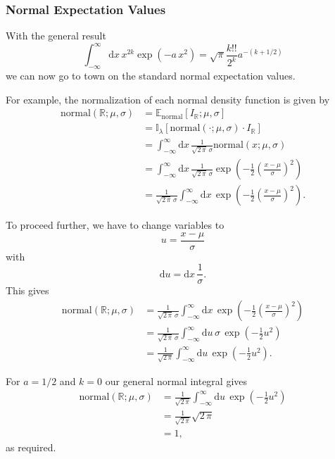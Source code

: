 \documentclass[
  letterpaper,
  DIV=11,
  numbers=noendperiod]{scrartcl}
\begin{document}
\subsubsection{Normal Expectation
Values}\label{normal-expectation-values}

With the general result \[
\int_{-\infty}^{\infty} \mathrm{d} x \,
x^{2 k} \exp \left( -a \, x^{2} \right)
=
\sqrt{\pi} \frac{k!!}{2^{k}} a^{-(k + 1/2)}
\] we can now go to town on the standard normal expectation values.

For example, the normalization of each normal density function is given
by \begin{align*}
\mathrm{normal}(\mathbb{R}; \mu, \sigma)
&=
\mathbb{E}_{\mathrm{normal}}[ I_{\mathbb{R}} ; \mu, \sigma ]
\\
&=
\mathbb{I}_{\lambda}[
  \mathrm{normal}(\cdot; \mu, \sigma) \cdot I_{\mathbb{R}}
]
\\
&=
\int_{-\infty}^{\infty} \mathrm{d} x \,
\frac{1}{\sqrt{2 \, \pi} \, \sigma}
\mathrm{normal}(x; \mu, \sigma)
\\
&=
\int_{-\infty}^{\infty} \mathrm{d} x \,
\frac{1}{\sqrt{2 \, \pi} \, \sigma}
\exp\left(
  -\frac{1}{2} \left( \frac{x - \mu}{\sigma} \right)^{2}
\right)
\\
&=
\frac{1}{\sqrt{2 \, \pi} \, \sigma}
\int_{-\infty}^{\infty} \mathrm{d} x \,
\exp \left(
  -\frac{1}{2} \left( \frac{x - \mu}{\sigma} \right)^{2}
\right).
\end{align*}

To proceed further, we have to change variables to \[
u = \frac{x - \mu}{\sigma}
\] with \[
\mathrm{d} u = \mathrm{d} x \, \frac{1}{\sigma}.
\] This gives \begin{align*}
\mathrm{normal}(\mathbb{R}; \mu, \sigma)
&=
\frac{1}{\sqrt{2 \, \pi} \, \sigma}
\int_{-\infty}^{\infty} \mathrm{d} x \,
\exp \left(
  -\frac{1}{2} \left( \frac{x - \mu}{\sigma} \right)^{2}
\right)
\\
&=
\frac{1}{\sqrt{2 \, \pi} \, \sigma}
\int_{-\infty}^{\infty} \mathrm{d} u \, \sigma \,
\exp \left( -\frac{1}{2} u^{2} \right)
\\
&=
\frac{1}{\sqrt{2 \, \pi}}
\int_{-\infty}^{\infty} \mathrm{d} u \,
\exp \left( -\frac{1}{2} u^{2} \right).
\end{align*}

For \(a = 1/2\) and \(k = 0\) our general normal integral gives
\begin{align*}
\mathrm{normal}(\mathbb{R}; \mu, \sigma)
&=
\frac{1}{\sqrt{2 \, \pi}}
\int_{-\infty}^{\infty} \mathrm{d} u \,
\exp \left( -\frac{1}{2} u^{2} \right)
\\
&=
\frac{1}{\sqrt{2 \, \pi}} \sqrt{2 \, \pi}
\\
&= 1,
\end{align*} as required.
\end{document}
